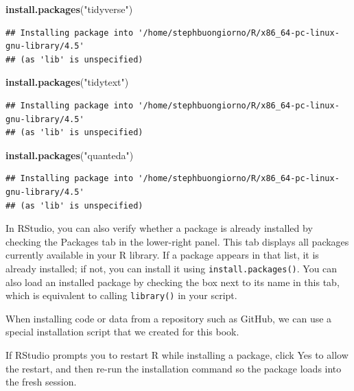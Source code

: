 \documentclass[
]{article}
\newenvironment{Shaded}{\begin{snugshade}}{\end{snugshade}}
\newcommand{\FunctionTok}[1]{\textcolor[rgb]{0.13,0.29,0.53}{\textbf{#1}}}
\newcommand{\NormalTok}[1]{#1}
\newcommand{\StringTok}[1]{\textcolor[rgb]{0.31,0.60,0.02}{#1}}
\begin{document}
\begin{Shaded}
\begin{Highlighting}[]
\FunctionTok{install.packages}\NormalTok{(}\StringTok{"tidyverse"}\NormalTok{)}
\end{Highlighting}
\end{Shaded}

\begin{verbatim}
## Installing package into '/home/stephbuongiorno/R/x86_64-pc-linux-gnu-library/4.5'
## (as 'lib' is unspecified)
\end{verbatim}

\begin{Shaded}
\begin{Highlighting}[]
\FunctionTok{install.packages}\NormalTok{(}\StringTok{"tidytext"}\NormalTok{)}
\end{Highlighting}
\end{Shaded}

\begin{verbatim}
## Installing package into '/home/stephbuongiorno/R/x86_64-pc-linux-gnu-library/4.5'
## (as 'lib' is unspecified)
\end{verbatim}

\begin{Shaded}
\begin{Highlighting}[]
\FunctionTok{install.packages}\NormalTok{(}\StringTok{"quanteda"}\NormalTok{)}
\end{Highlighting}
\end{Shaded}

\begin{verbatim}
## Installing package into '/home/stephbuongiorno/R/x86_64-pc-linux-gnu-library/4.5'
## (as 'lib' is unspecified)
\end{verbatim}

In RStudio, you can also verify whether a package is already installed
by checking the Packages tab in the lower-right panel. This tab displays
all packages currently available in your R library. If a package appears
in that list, it is already installed; if not, you can install it using
\texttt{install.packages()}. You can also load an installed package by
checking the box next to its name in this tab, which is equivalent to
calling \texttt{library()} in your script.

When installing code or data from a repository such as GitHub, we can
use a special installation script that we created for this book.

If RStudio prompts you to restart R while installing a package, click
Yes to allow the restart, and then re-run the installation command so
the package loads into the fresh session.
\end{document}
